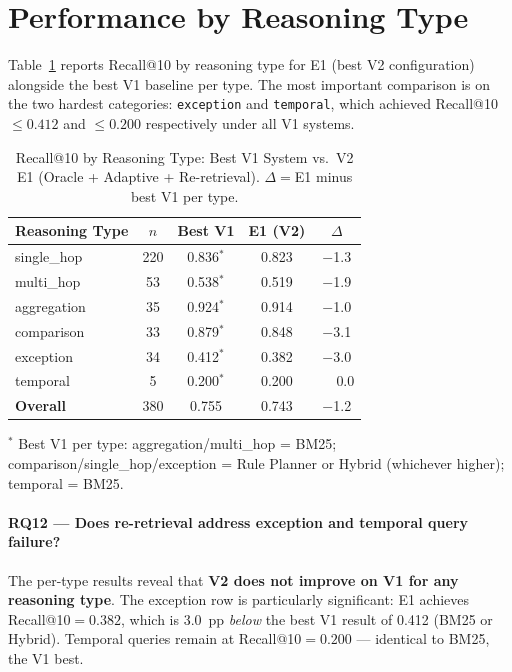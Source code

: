 
\section{Performance by Reasoning Type}
\label{sec:v2_by_type}

Table~\ref{tab:v2_by_type} reports Recall@10 by reasoning type for E1 (best V2 configuration) alongside the best V1 baseline per type. The most important comparison is on the two hardest categories: \texttt{exception} and \texttt{temporal}, which achieved Recall@10 ${\leq}0.412$ and ${\leq}0.200$ respectively under all V1 systems.

\begin{table}[htbp]
\centering
\caption{Recall@10 by Reasoning Type: Best V1 System vs.\ V2 E1 (Oracle + Adaptive + Re-retrieval). $\Delta{=}$E1 minus best V1 per type.}
\label{tab:v2_by_type}
\begin{tabular}{lcccc}
\toprule
\textbf{Reasoning Type} & \textbf{$n$} & \textbf{Best V1} & \textbf{E1 (V2)} & \textbf{$\Delta$} \\
\midrule
single\_hop    & 220 & 0.836$^*$ & 0.823 & $-$1.3 \\
multi\_hop     & 53  & 0.538$^*$ & 0.519 & $-$1.9 \\
aggregation    & 35  & 0.924$^*$ & 0.914 & $-$1.0 \\
comparison     & 33  & 0.879$^*$ & 0.848 & $-$3.1 \\
exception      & 34  & 0.412$^*$ & 0.382 & $-$3.0 \\
temporal       & 5   & 0.200$^*$ & 0.200 & $\phantom{-}$0.0 \\
\midrule
\textbf{Overall} & 380 & 0.755 & 0.743 & $-$1.2 \\
\bottomrule
\end{tabular}
{\footnotesize $^*$ Best V1 per type: aggregation/multi\_hop = BM25; comparison/single\_hop/exception = Rule Planner or Hybrid (whichever higher); temporal = BM25.}
\end{table}

\FloatBarrier

\paragraph{RQ12 --- Does re-retrieval address exception and temporal query failure?}

The per-type results reveal that \textbf{V2 does not improve on V1 for any reasoning type}. The exception row is particularly significant: E1 achieves Recall@10$={0.382}$, which is 3.0~pp \emph{below} the best V1 result of 0.412 (BM25 or Hybrid). Temporal queries remain at Recall@10$={0.200}$ --- identical to BM25, the V1 best.

